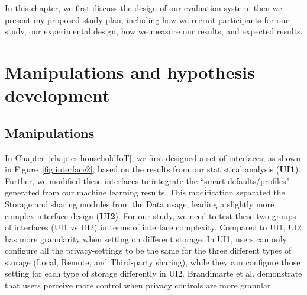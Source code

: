In this chapter, we first discuss the design of our evaluation system, then we present my proposed study plan, including how we recruit participants for our study, our experimental design, how we measure our results, and expected results.


\section{Manipulations and hypothesis development}

\subsection{Manipulations}

In Chapter~\ref{chapter:householdIoT},  we first designed a set of interfaces, as shown in Figure~\ref{fig:interface2}, based on the results from our statistical analysis (\textbf{UI1}). Further, we modified these interfaces to integrate the ``smart defaults/profiles" generated from our machine learning results. This modification separated the Storage and sharing modules from the Data usage, leading a slightly more complex interface design (\textbf{UI2}). For our study, we need to test these two groups of interfaces (UI1 vs UI2) in terms of interface complexity. Compared to UI1, UI2 has more granularity when setting on different storage. In UI1, users can only configure all the privacy-settings to be the same for the three different types of storage (Local, Remote, and Third-party sharing), while they can configure those setting for each type of storage differently in UI2. Brandimarte et al. demonstrate that users perceive more control when privacy controls are more granular~\cite{brandimarte2013misplaced}.

